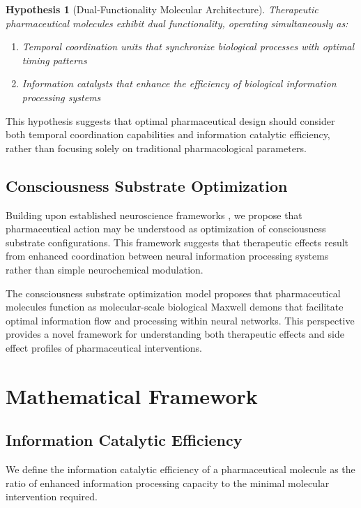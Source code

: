 \documentclass[12pt,a4paper]{article}
\newtheorem{hypothesis}[theorem]{Hypothesis}
\begin{document}
\begin{hypothesis}[Dual-Functionality Molecular Architecture]
Therapeutic pharmaceutical molecules exhibit dual functionality, operating simultaneously as:
\begin{enumerate}
\item Temporal coordination units that synchronize biological processes with optimal timing patterns
\item Information catalysts that enhance the efficiency of biological information processing systems
\end{enumerate}
\end{hypothesis}

This hypothesis suggests that optimal pharmaceutical design should consider both temporal coordination capabilities and information catalytic efficiency, rather than focusing solely on traditional pharmacological parameters.

\subsection{Consciousness Substrate Optimization}

Building upon established neuroscience frameworks \citep{clark2016surfing, hohwy2013predictive}, we propose that pharmaceutical action may be understood as optimization of consciousness substrate configurations. This framework suggests that therapeutic effects result from enhanced coordination between neural information processing systems rather than simple neurochemical modulation.

The consciousness substrate optimization model proposes that pharmaceutical molecules function as molecular-scale biological Maxwell demons that facilitate optimal information flow and processing within neural networks. This perspective provides a novel framework for understanding both therapeutic effects and side effect profiles of pharmaceutical interventions.

\section{Mathematical Framework}

\subsection{Information Catalytic Efficiency}

We define the information catalytic efficiency of a pharmaceutical molecule as the ratio of enhanced information processing capacity to the minimal molecular intervention required.
\end{document}
